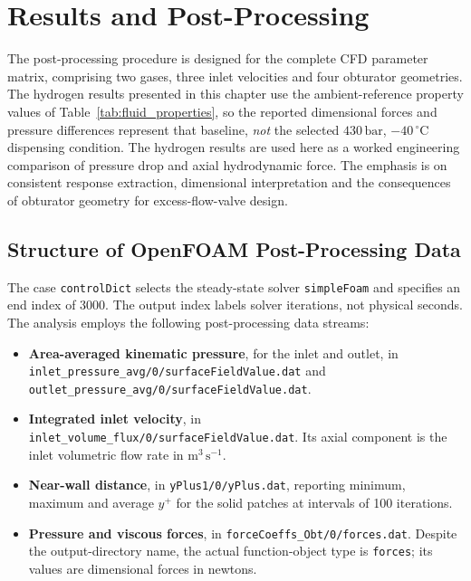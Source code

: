\chapter{Results and Post-Processing}
\label{ch:results}

The post-processing procedure is designed for the complete CFD parameter matrix, comprising two gases, three inlet velocities and four obturator geometries. The hydrogen results presented in this chapter use the ambient-reference property values of Table~\ref{tab:fluid_properties}, so the reported dimensional forces and pressure differences represent that baseline, \emph{not} the selected $430\,\mathrm{bar}$, $-40\,^{\circ}\mathrm{C}$ dispensing condition. The hydrogen results are used here as a worked engineering comparison of pressure drop and axial hydrodynamic force. The emphasis is on consistent response extraction, dimensional interpretation and the consequences of obturator geometry for excess-flow-valve design.

\section{Structure of OpenFOAM Post-Processing Data}
\label{sec:postprocessing_structure}

The case \texttt{controlDict} selects the steady-state solver \texttt{simpleFoam} and specifies an end index of 3000. The output index labels solver iterations, not physical seconds. The analysis employs the following post-processing data streams:
\begin{itemize}
\item \textbf{Area-averaged kinematic pressure}, for the inlet and outlet, in \texttt{inlet\_pressure\_avg/0/surfaceFieldValue.dat} and \texttt{outlet\_pressure\_avg/0/surfaceFieldValue.dat}.
\item \textbf{Integrated inlet velocity}, in \texttt{inlet\_volume\_flux/0/surfaceFieldValue.dat}. Its axial component is the inlet volumetric flow rate in $\mathrm{m^3\,s^{-1}}$.
\item \textbf{Near-wall distance}, in \texttt{yPlus1/0/yPlus.dat}, reporting minimum, maximum and average $y^+$ for the solid patches at intervals of 100 iterations.
\item \textbf{Pressure and viscous forces}, in \texttt{forceCoeffs\_Obt/0/forces.dat}. Despite the output-directory name, the actual function-object type is \texttt{forces}; its values are dimensional forces in newtons.
\end{itemize}

